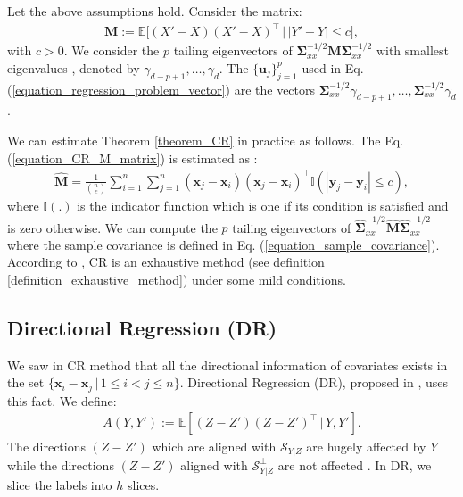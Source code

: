 \documentclass[lang=cn,10pt]{gorgeousnbook}
\numberwithin{equation}{section}%
\numberwithin{figure}{section}%
\begin{document}
\begin{theorem}[]\label{theorem_CR}
Let the above assumptions hold. Consider the matrix:
\begin{equation}\label{equation_CR_M_matrix}
\begin{aligned}
\boldsymbol{M} := \mathbb{E}\big[(X' - X)(X' - X)^\top\, \big|\, |Y' - Y| \leq c\big],
\end{aligned}
\end{equation}
with $c > 0$.
We consider the $p$ tailing eigenvectors of $\boldsymbol{\Sigma}_{xx}^{-1/2} \boldsymbol{M} \boldsymbol{\Sigma}_{xx}^{-1/2}$ with smallest eigenvalues \cite{ghojogh2019eigenvalue}, denoted by $\gamma_{d-p+1}, \dots, \gamma_{d}$. The $\{\boldsymbol{u}_j\}_{j=1}^p$ used in Eq. (\ref{equation_regression_problem_vector}) are the vectors $\boldsymbol{\Sigma}_{xx}^{-1/2} \gamma_{d-p+1}, \dots, \boldsymbol{\Sigma}_{xx}^{-1/2} \gamma_{d}$.
\end{theorem}

We can estimate Theorem \ref{theorem_CR} in practice as follows. 
The Eq. (\ref{equation_CR_M_matrix}) is estimated as \cite{li2005contour}:
\begin{equation*}
\begin{aligned}
\widehat{\boldsymbol{M}} = \frac{1}{\binom{n}{c}} \sum_{i=1}^n \sum_{j=1}^n (\boldsymbol{x}_j - \boldsymbol{x}_i)(\boldsymbol{x}_j - \boldsymbol{x}_i)^\top \mathbb{I}(|\boldsymbol{y}_j - \boldsymbol{y}_i| \leq c),
\end{aligned}
\end{equation*}
where $\mathbb{I}(.)$ is the indicator function which is one if its condition is satisfied and is zero otherwise. 
We can compute the $p$ tailing eigenvectors of $\widehat{\boldsymbol{\Sigma}}_{xx}^{-1/2} \widehat{\boldsymbol{M}} \widehat{\boldsymbol{\Sigma}}_{xx}^{-1/2}$ where the sample covariance is defined in Eq. (\ref{equation_sample_covariance}).
According to \cite{li2007directional}, CR is an exhaustive method (see definition \ref{definition_exhaustive_method}) under some mild conditions.

\subsection{Directional Regression (DR)}

We saw in CR method that all the directional information of covariates exists in the set $\{\boldsymbol{x}_i - \boldsymbol{x}_j\, |\, 1 \leq i < j \leq n\}$.
Directional Regression (DR), proposed in \cite{li2007directional}, uses this fact. We define:
\begin{align*}
A(Y, Y') := \mathbb{E}[(Z - Z')(Z - Z')^\top\, |\, Y, Y'].
\end{align*}
The directions $(Z - Z')$ which are aligned with $\mathcal{S}_{Y|Z}$ are hugely affected by $Y$ while the directions $(Z - Z')$ aligned with $\mathcal{S}_{Y|Z}^\bot$ are not affected \cite{li2007directional}. 
In DR, we slice the labels into $h$ slices. 
\end{document}
